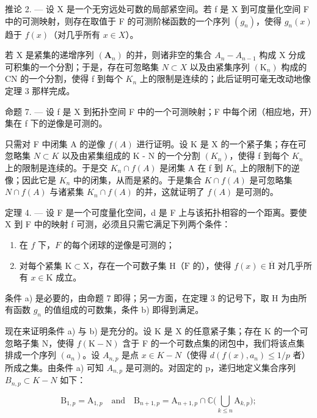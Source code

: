 推论 2. --- 设 X 是一个无穷远处可数的局部紧空间。若 f 是 X 到可度量化空间 F 中的可测映射，则存在取值于 F 的可测阶梯函数的一个序列 \((g_{n})\)，使得 \(g_{n}(x)\) 趋于 \(f(x)\)（对几乎所有 \(x \in X\)）。

若 X 是紧集的递增序列 \((\mathbf{A}_{n})\) 的并，则诸非空的集合 \(A_{n}-A_{n-1}\) 构成 X 分成可积集的一个分割；于是，存在可忽略集 \(N\subset X\) 以及由紧集序列 \((\mathrm{K}_{n})\) 构成的 CN 的一个分割，使得 f 到每个 \(K_{n}\) 上的限制是连续的；此后证明可毫无改动地像定理 3 那样完成。

命题 7. --- 设 f 是 X 到拓扑空间 F 中的一个可测映射；F 中每个闭（相应地，开）集在 f 下的逆像是可测的。

只需对 F 中闭集 A 的逆像 \(f(A)\) 进行证明。设 K 是 X 的一个紧子集；存在可忽略集 \(N \subset K\) 以及由紧集组成的 K - N 的一个分割 \((K_n)\)，使得 f 到每个 \(K_n\) 上的限制是连续的。于是交 \(K_n \cap f(A)\) 是闭集 A 在 f 到 \(K_n\) 上的限制下的逆像；因此它是 \(K_n\) 中的闭集，从而是紧的。于是集合 \(K \cap f(A)\) 是可忽略集 \(N \cap f(A)\) 与诸紧集 \(K_n \cap f(A)\) 的并，这就证明了 \(f(A)\) 是可测的。

定理 4. --- 设 F 是一个可度量化空间，d 是 F 上与该拓扑相容的一个距离。要使 X 到 F 中的映射 f 可测，必须且只需它满足下列两个条件：

\begin{enumerate}
\def\labelenumi{\alph{enumi})}
\item
  在 \(f\) 下，\(F\) 的每个闭球的逆像是可测的；
\item
  对每个紧集 \(\mathrm{K} \subset \mathrm{X}\)，存在一个可数子集 \(\mathrm{H}\)（\(\mathrm{F}\) 的），使得 \(f(x) \in \overline{\mathrm{H}}\) 对几乎所有 \(x \in \mathrm{K}\) 成立。
\end{enumerate}

条件 a) 是必要的，由命题 7 即得；另一方面，在定理 3 的记号下，取 H 为由所有函数 \(g_{n}\) 的值组成的可数集，条件 b) 即得到满足。

现在来证明条件 a) 与 b) 是充分的。设 K 是 X 的任意紧子集；存在 K 的一个可忽略子集 N，使得 \(f(\mathrm{K}-\mathrm{N})\) 含于 F 的一个可数点集的闭包中，我们将该点集排成一个序列 \((a_{n})\)。设 \(A_{n,p}\) 是点 \(x \in K-N\)（使得 \(d(f(x), a_{n}) \leqslant 1/p\) 者）所成之集。由条件 a) 可知 \(A_{n,p}\) 是可测的。对固定的 p，递归地定义集合序列 \(B_{n,p} \subset K-N\) 如下：

\[
\mathrm{B} _ {1, p} = \mathrm{A} _ {1, p} \quad \text {and} \quad \mathrm{B} _ {n + 1, p} = \mathrm{A} _ {n + 1, p} \cap \mathbb {C} \Big (\bigcup_ {k \leqslant n} \mathrm{A} _ {k, p} \Big);
\]

